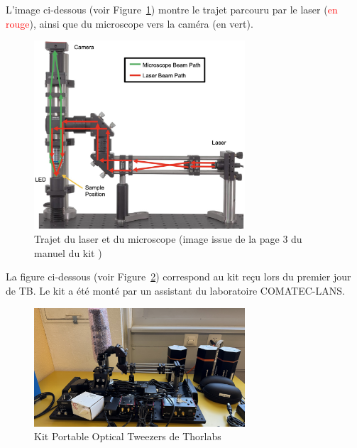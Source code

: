 L'image ci-dessous (voir Figure~\ref{chemin_laser_caméra}) montre le trajet parcouru par le laser (\textcolor{red}{en rouge}), ainsi que du microscope vers la caméra (\textcolor[RGB]{0, 120, 0}{en vert}).
\begin{figure}[H]
    \begin{center}
        \includegraphics[width=0.7\textwidth]{assets/figures/Introduction/chemin_laser_camera.jpeg}
    \end{center}
    \caption{Trajet du laser et du microscope (image issue de la page 3 du manuel du kit \cite{manualPortableOpticalTweezers})}
    \label{chemin_laser_caméra}
\end{figure}

La figure ci-dessous (voir Figure~\ref{kit_vierge}) correspond au kit reçu lors du premier jour de TB. Le kit a été monté par un assistant du laboratoire COMATEC-LANS.

\begin{figure}[H]
    \begin{center}
        \includegraphics[width=0.7\textwidth]{assets/figures/Introduction/kit_vierge.jpeg}
    \end{center}
    \caption{Kit Portable Optical Tweezers de Thorlabs}
    \label{kit_vierge}
\end{figure}

